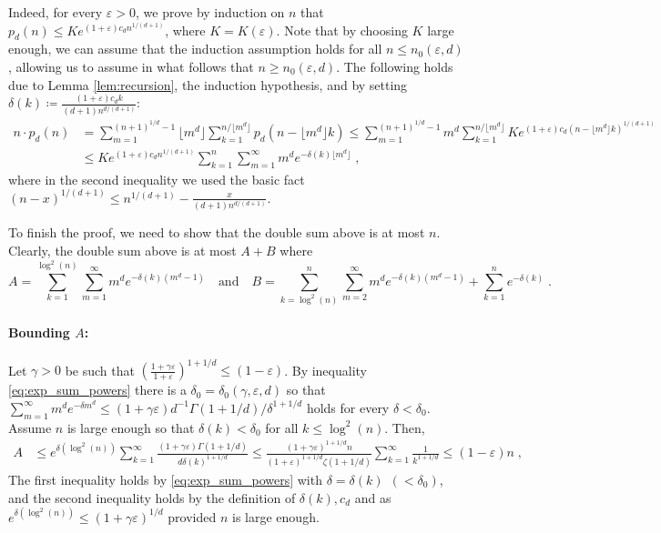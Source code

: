 \documentclass[11pt]{article}
\theoremstyle{plain}
\begin{document}
Indeed, for every $\varepsilon>0$, we prove by induction on $n$ that $p_d(n) \leq K e^{(1+\varepsilon)c_dn^{1/(d+1)}}$, where $K=K(\varepsilon)$. Note that by choosing $K$ large enough, we can assume that the induction assumption holds for all $n \leq n_0(\varepsilon,d)$, allowing us to assume in what follows that $n \geq n_0(\varepsilon,d)$.
The following holds due to Lemma \ref{lem:recursion}, the induction hypothesis, and by setting $\delta(k)\coloneqq \frac{(1+\varepsilon)c_d k}{(d+1)n^{d/(d+1)}}$:
\begin{align*}
    n\cdot p_{d}(n)&= \sum_{m=1}^{(n+1)^{1/d}-1} \lfloor m^{d}\rfloor\sum _{k=1}^{n/\lfloor m^d\rfloor } p_{d}(n-\lfloor m^d\rfloor k) \leq \sum_{m=1}^{(n+1)^{1/d}-1}m^d \sum _{k=1}^{n/\lfloor m^{d}\rfloor} K e^{(1+\varepsilon)c_d(n-\lfloor m^d\rfloor k)^{1/(d+1)}}\nonumber\\
    &\leq Ke^{(1+\varepsilon)c_d n^{1/(d+1)}}\sum _{k=1}^{n} \sum_{m=1}^{\infty}m^d e^{-\delta(k)\lfloor m^{d}\rfloor}\;,
\end{align*}
where in the second inequality we used the basic fact $(n-x)^{1/(d+1)} \leq n^{1/(d+1)}-\frac{x}{(d+1)n^{d/(d+1)}}$.





To finish the proof, we need to show that the double sum above is at most $n$.
Clearly, the double sum above is at most $A+B$ where
\[
    A=  \sum _{k=1}^{\log^{2}(n)} \sum_{m=1}^{\infty} m^{d}e^{-\delta(k) (m^{d}-1)} \quad\text{and}\quad B=\sum_{k=\log^{2}(n)}^{n}\sum_{m=2}^{\infty} m^{d} e^{-\delta(k) (m^{d}-1)}+\sum_{k=1}^{n}e^{-\delta(k)}\;.
\]
\paragraph{Bounding $A$:}
Let $\gamma>0$ be such that $\left(\frac{1+\gamma \varepsilon}{1+\varepsilon}\right)^{1+1/d}\leq (1-\varepsilon)$. By inequality \eqref{eq:exp_sum_powers} there is a $\delta_0=\delta_0(\gamma, \varepsilon,d)$ so that $ \sum_{m=1}^{\infty} m^{d} e^{-\delta m^{d}} \leq (1+\gamma \varepsilon)d^{-1}\Gamma(1+1/d)/\delta^{1+1/d}$ holds for every $\delta < \delta_0$. Assume $n$ is large enough so that $\delta(k)< \delta_0$ for all $k\leq \log^2(n)$. Then, \begin{align*}\label{eq:after_integral}
     A&\leq  e^{\delta(\log^2(n))}\sum_{k=1}^{\infty} \frac{(1+\gamma \varepsilon)\Gamma(1+1/d)}{d\delta(k)^{1+1/d}}\leq  \frac{(1+\gamma \varepsilon)^{1+1/d}n}{(1+\varepsilon)^{1+1/d}\zeta(1+1/d)}\sum_{k=1}^{\infty}\frac{1}{k^{1+1/d}}\leq  \left(1-\varepsilon\right)n\;,
\end{align*}
The first inequality holds by \eqref{eq:exp_sum_powers} with $\delta=\delta(k)~~(<\delta_0)$, and the second inequality holds by the definition of $\delta(k),c_d$ and as $e^{\delta(\log^2(n))}\leq (1+\gamma \varepsilon)^{1/d}$ provided $n$ is large enough.
\end{document}
